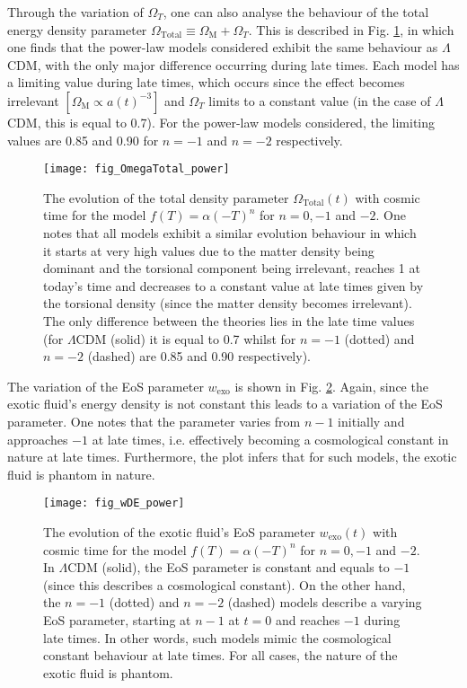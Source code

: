 \documentclass[prl,floatfix,showpacs,twocolumn,preprintnumbers,amsmath,amssymb,superscriptaddress]{revtex4}
\begin{document}
Through the variation of $\Omega_T$, one can also analyse the behaviour of the total energy density parameter $\Omega_{\text{Total}} \equiv \Omega_\text{M} + \Omega_T$. This is described in Fig. \ref{fig:fig_OmegaTotal_power}, in which one finds that the power-law models considered exhibit the same behaviour as $\Lambda$CDM, with the only major difference occurring during late times. Each model has a limiting value during late times, which occurs since the effect becomes irrelevant $\left[\Omega_{\text{M}} \propto a(t)^{-3}\right]$ and $\Omega_T$ limits to a constant value (in the case of $\Lambda$CDM, this is equal to 0.7).  For the power-law models considered, the limiting values are 0.85 and 0.90 for $n = -1$ and $n = -2$ respectively.

\begin{figure}[h!]
\texttt{[image: fig\_OmegaTotal\_power]}
\caption{The evolution of the total density parameter $\Omega_{\text{Total}}(t)$ with cosmic time for the model $f(T) = \alpha \left(-T\right)^n$ for $n = 0, -1$ and $-2$. One notes that all models exhibit a similar evolution behaviour in which it starts at very high values due to the matter density being dominant and the torsional component being irrelevant, reaches 1 at today's time and decreases to a constant value at late times given by the torsional density (since the matter density becomes irrelevant). The only difference between the theories lies in the late time values (for $\Lambda$CDM (solid) it is equal to 0.7 whilst for $n = -1$ (dotted) and $n = -2$ (dashed) are 0.85 and 0.90 respectively).}
\label{fig:fig_OmegaTotal_power}
\end{figure}

The variation of the EoS parameter $w_{\text{exo}}$ is shown in Fig. \ref{fig:fig_wDE_power}. Again, since the exotic fluid's energy density is not constant this leads to a variation of the EoS parameter. One notes that the parameter varies from $n-1$ initially and approaches $-1$ at late times, i.e. effectively becoming a cosmological constant in nature at late times. Furthermore, the plot infers that for such models, the exotic fluid is phantom in nature. 

\begin{figure}[h!]
\texttt{[image: fig\_wDE\_power]}
\caption{The evolution of the exotic fluid's EoS parameter $w_{\text{exo}}(t)$ with cosmic time for the model $f(T) = \alpha \left(-T\right)^n$ for $n = 0, -1$ and $-2$. In $\Lambda$CDM (solid), the EoS parameter is constant and equals to $-1$ (since this describes a cosmological constant). On the other hand, the $n = -1$ (dotted) and $n = -2$ (dashed) models describe a varying EoS parameter, starting at $n - 1$ at $t = 0$ and reaches $-1$ during late times. In other words, such models mimic the cosmological constant behaviour at late times. For all cases, the nature of the exotic fluid is phantom.}
\label{fig:fig_wDE_power}
\end{figure}
\end{document}
